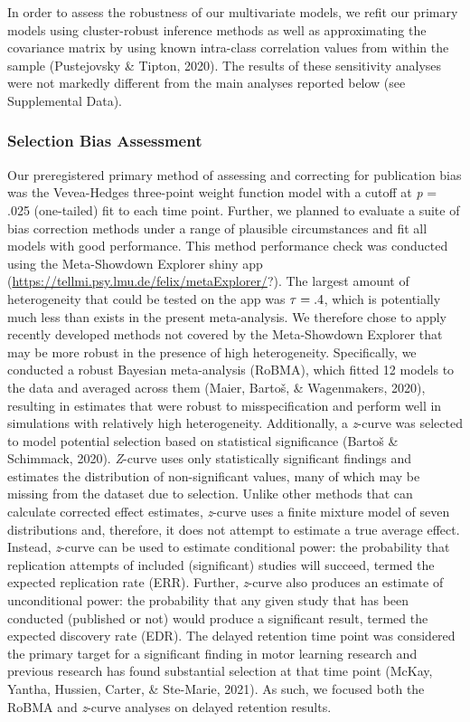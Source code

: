 \documentclass[
  english,
  man, donotrepeattitle,floatsintext]{apa7}
\begin{document}
In order to assess the robustness of our multivariate models, we refit our primary models using cluster-robust inference methods as well as approximating the covariance matrix by using known intra-class correlation values from within the sample (Pustejovsky \& Tipton, 2020). The results of these sensitivity analyses were not markedly different from the main analyses reported below (see Supplemental Data).

\hypertarget{selection-bias-assessment}{%
\subsubsection{Selection Bias Assessment}\label{selection-bias-assessment}}

Our preregistered primary method of assessing and correcting for publication bias was the Vevea-Hedges three-point weight function model with a cutoff at \emph{p} = .025 (one-tailed) fit to each time point. Further, we planned to evaluate a suite of bias correction methods under a range of plausible circumstances and fit all models with good performance. This method performance check was conducted using the Meta-Showdown Explorer shiny app (\url{https://tellmi.psy.lmu.de/felix/metaExplorer/}?). The largest amount of heterogeneity that could be tested on the app was \(\small\tau = .4\), which is potentially much less than exists in the present meta-analysis. We therefore chose to apply recently developed methods not covered by the Meta-Showdown Explorer that may be more robust in the presence of high heterogeneity. Specifically, we conducted a robust Bayesian meta-analysis (RoBMA), which fitted 12 models to the data and averaged across them (Maier, Bartoš, \& Wagenmakers, 2020), resulting in estimates that were robust to misspecification and perform well in simulations with relatively high heterogeneity. Additionally, a \emph{z}-curve was selected to model potential selection based on statistical significance (Bartoš \& Schimmack, 2020). \emph{Z}-curve uses only statistically significant findings and estimates the distribution of non-significant values, many of which may be missing from the dataset due to selection. Unlike other methods that can calculate corrected effect estimates, \emph{z}-curve uses a finite mixture model of seven distributions and, therefore, it does not attempt to estimate a true average effect. Instead, \emph{z}-curve can be used to estimate conditional power: the probability that replication attempts of included (significant) studies will succeed, termed the expected replication rate (ERR). Further, \emph{z}-curve also produces an estimate of unconditional power: the probability that any given study that has been conducted (published or not) would produce a significant result, termed the expected discovery rate (EDR). The delayed retention time point was considered the primary target for a significant finding in motor learning research and previous research has found substantial selection at that time point (McKay, Yantha, Hussien, Carter, \& Ste-Marie, 2021). As such, we focused both the RoBMA and \emph{z}-curve analyses on delayed retention results.
\end{document}
